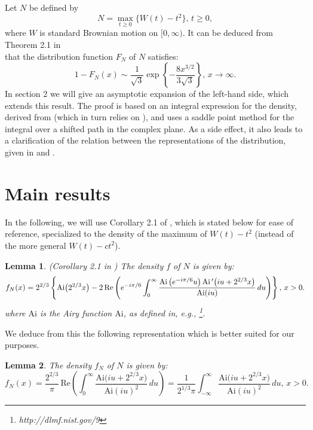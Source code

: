 \documentclass[11pt]{article}
\newtheorem{lemma}{Lemma}[section]
\begin{document}
Let $N$ be defined by
\begin{equation}
\label{def_max}
N=\max_{t\ge0}\{W(t)-t^2\},\,t\ge0,
\end{equation}
where $W$ is standard Brownian motion on $[0,\infty)$. It can be deduced from Theorem 2.1 in\\ {{\small \sc {}}} that the distribution function $F_N$ of $N$ satisfies:
$$
1-F_N(x)\sim \frac1{\sqrt{3}}\exp\left\{-\frac{8x^{3/2}}{3\sqrt{3}}\right\},\,x\to\infty.
$$
In section 2 we will give an asymptotic expansion of the left-hand side, which extends this result.
The proof is based on an integral expression for the density, derived from {{\small \sc {}}} (which in turn relies on {{\small \sc {}}}), and uses a saddle point method for the integral over a shifted path in the complex plane. As a side effect, it also leads to a clarification of the relation between the representations of the distribution, given in {{\small \sc {}}} and {{\small \sc {}}}.

\section{Main results}
\label{section:main_result}
In the following, we will use Corollary 2.1 of {{\small \sc {}}}, which is stated below for ease of reference, specialized to the density of the maximum of $W(t)-t^2$ (instead of the more general $W(t)-ct^2$).

\begin{lemma}
{\rm (Corollary 2.1 in {{\small \sc {}}})}
\label{lemma:dens_M}
The density $f$ of $N$ is given by:
\begin{equation}
\label{density_representation}
f_N(x)=2^{2/3}\left\{{\mathrm {Ai}}\bigl(2^{2/3}x\bigr) -2\,{\mathrm {Re}}\left(e^{-i\pi/6}\int_0^{\infty}\frac{{\rm {\mathrm {Ai}}}\left(e^{-i\pi/6}u\right){\mathrm {Ai}}\,'\bigl(iu+2^{2/3}x\bigr)}{\mathrm {Ai}(iu)}\,du\right)\right\},\,x>0.
\end{equation}
where ${\mathrm {Ai}}$ is the Airy function ${\mathrm {Ai}}$, as defined in, e.g., {{\small \sc {}}}\footnote{http://dlmf.nist.gov/9}.
\end{lemma}

We deduce from this the following representation which is better suited for our purposes.

\begin{lemma}
\label{lemma:dens_representation}
The density $f_N$ of $N$ is given by:
\begin{equation}
\label{density_representation2}
f_N(x)=\frac{2^{2/3}}{\pi}\,{{\mathrm {Re}}}\left(\int_0^{\infty}\frac{\mathrm {Ai}\bigl(iu+2^{2/3}x\bigr)}{\mathrm {Ai}(iu)^2}\,du\right)=\frac1{2^{1/3}\pi}\int_{-\infty}^{\infty}\frac{\mathrm {Ai}\bigl(iu+2^{2/3}x\bigr)}{\mathrm {Ai}(iu)^2}\,du,\,x>0.
\end{equation}
\end{lemma}
\end{document}

